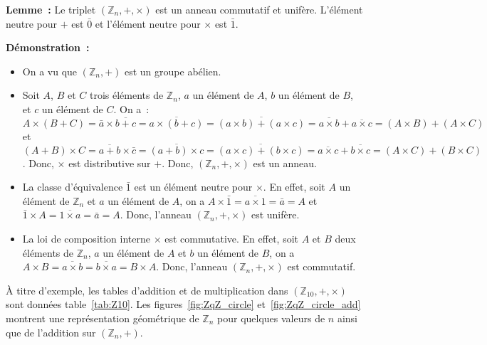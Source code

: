 \done

\medskip

\noindent\textbf{Lemme :} Le triplet $\left( \mathbb{Z}_n, +, \times \right)$ est un anneau commutatif et unifère. 
    L'élément neutre pour $+$ est $\bar{0}$ et l'élément neutre pour $\times$ est $\bar{1}$.

\medskip

\noindent\textbf{Démonstration :} 
\begin{itemize}[nosep]
    \item On a vu que $\left( \mathbb{Z}_n, + \right)$ est un groupe abélien.
    \item Soit $A$, $B$ et $C$ trois éléments de $\mathbb{Z}_n$, $a$ un élément de $A$, $b$ un élément de $B$, et $c$ un élément de $C$.
        On a : $A \times (B + C) = \bar{a} \times \overline{b+c} = \overline{a \times (b+c)} = \overline{(a \times b) + (a \times c)} = \overline{a \times b} + \overline{a \times c} = (A \times B) + (A \times C)$ et $(A+B) \times C  = \overline{a+b} \times \bar{c} = \overline{(a+b) \times c} = \overline{(a \times c) + (b \times c)} = \overline{a \times c} + \overline{b \times c} = (A \times C) + (B \times C)$.
        Donc, $\times$ est distributive sur $+$.
        Donc, $\left( \mathbb{Z}_n, +, \times \right)$ est un anneau.
    \item La classe d'équivalence $\bar{1}$ est un élément neutre pour $\times$. 
        En effet, soit $A$ un élément de $\mathbb{Z}_n$ et $a$ un élément de $A$, on a $A \times \bar{1} = \overline{a \times 1} = \bar{a} = A$ et $\bar{1} \times A = \overline{1 \times a} = \bar{a} = A$.
        Donc, l'anneau $\left( \mathbb{Z}_n, +, \times \right)$ est unifère.
    \item La loi de composition interne $\times$ est commutative.
        En effet, soit $A$ et $B$ deux éléments de $\mathbb{Z}_n$, $a$ un élément de $A$ et $b$ un élément de $B$, on a $A \times B = \overline{a \times b} = \overline{b \times a} = B \times A$.
        Donc, l'anneau $\left( \mathbb{Z}_n, +, \times \right)$ est commutatif.
\end{itemize}

\done

\medskip

À titre d'exemple, les tables d'addition et de multiplication dans $(\mathbb{Z}_10, +, \times)$ sont données table~\ref{tab:Z10}. 
Les figures~\ref{fig:ZqZ_circle} et~\ref{fig:ZqZ_circle_add} montrent une représentation géométrique de $\mathbb{Z}_n$ pour quelques valeurs de $n$ ainsi que de l'addition sur $(\mathbb{Z}_n, +)$.

